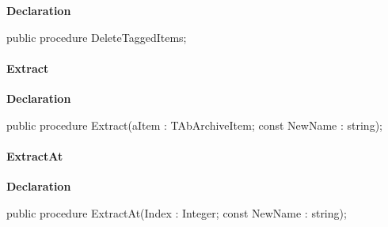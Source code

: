 \documentclass{report}
\newif\ifpdf
\begin{document}
\label{AbArcTyp.TAbArchive-DeleteTaggedItems}
\begin{list}{}{
\setlength{\itemindent}{0cm}
\setlength{\listparindent}{0cm}
\setlength{\leftmargin}{\evensidemargin}
\addtolength{\leftmargin}{\tmplength}
\settowidth{\labelsep}{X}
\addtolength{\leftmargin}{\labelsep}
\setlength{\labelwidth}{\tmplength}
}
\item[\textbf{Declaration}\hfill]
\ifpdf
\begin{flushleft}
\fi
\begin{ttfamily}
public procedure DeleteTaggedItems;\end{ttfamily}

\ifpdf
\end{flushleft}
\fi

\end{list}
\paragraph*{Extract}\hspace*{\fill}

\label{AbArcTyp.TAbArchive-Extract}
\begin{list}{}{
\setlength{\itemindent}{0cm}
\setlength{\listparindent}{0cm}
\setlength{\leftmargin}{\evensidemargin}
\addtolength{\leftmargin}{\tmplength}
\settowidth{\labelsep}{X}
\addtolength{\leftmargin}{\labelsep}
\setlength{\labelwidth}{\tmplength}
}
\item[\textbf{Declaration}\hfill]
\ifpdf
\begin{flushleft}
\fi
\begin{ttfamily}
public procedure Extract(aItem : TAbArchiveItem; const NewName : string);\end{ttfamily}

\ifpdf
\end{flushleft}
\fi

\end{list}
\paragraph*{ExtractAt}\hspace*{\fill}

\label{AbArcTyp.TAbArchive-ExtractAt}
\begin{list}{}{
\setlength{\itemindent}{0cm}
\setlength{\listparindent}{0cm}
\setlength{\leftmargin}{\evensidemargin}
\addtolength{\leftmargin}{\tmplength}
\settowidth{\labelsep}{X}
\addtolength{\leftmargin}{\labelsep}
\setlength{\labelwidth}{\tmplength}
}
\item[\textbf{Declaration}\hfill]
\ifpdf
\begin{flushleft}
\fi
\begin{ttfamily}
public procedure ExtractAt(Index : Integer; const NewName : string);\end{ttfamily}

\ifpdf
\end{flushleft}
\fi

\end{list}
\end{document}

